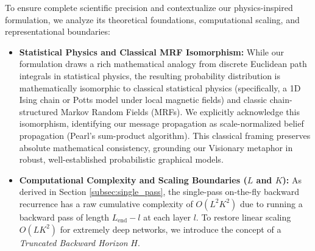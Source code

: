 To ensure complete scientific precision and contextualize our physics-inspired formulation, we analyze its theoretical foundations, computational scaling, and representational boundaries:

\begin{itemize}
    \item \textbf{Statistical Physics and Classical MRF Isomorphism:} While our formulation draws a rich mathematical analogy from discrete Euclidean path integrals in statistical physics, the resulting probability distribution is mathematically isomorphic to classical statistical physics (specifically, a 1D Ising chain or Potts model under local magnetic fields) and classic chain-structured Markov Random Fields (MRFs). We explicitly acknowledge this isomorphism, identifying our message propagation as scale-normalized belief propagation (Pearl's sum-product algorithm). This classical framing preserves absolute mathematical consistency, grounding our Visionary metaphor in robust, well-established probabilistic graphical models.
    \item \textbf{Computational Complexity and Scaling Boundaries ($L$ and $K$):} As derived in Section \ref{subsec:single_pass}, the single-pass on-the-fly backward recurrence has a raw cumulative complexity of $O(L^2 K^2)$ due to running a backward pass of length $L_{\text{end}} - l$ at each layer $l$. To restore linear scaling $O(L K^2)$ for extremely deep networks, we introduce the concept of a \emph{Truncated Backward Horizon} $H$. 
    

\end{itemize}
